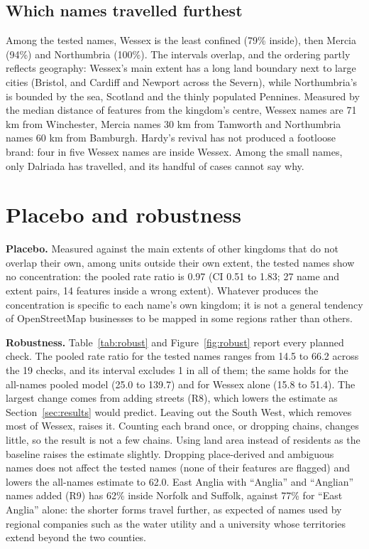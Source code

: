 \documentclass[11pt,a4paper]{article}
\begin{document}
\subsection{Which names travelled furthest}
Among the tested names, Wessex is the least confined (79\% inside), then Mercia (94\%) and Northumbria (100\%). The intervals overlap, and the ordering partly reflects geography: Wessex's main extent has a long land boundary next to large cities (Bristol, and Cardiff and Newport across the Severn), while Northumbria's is bounded by the sea, Scotland and the thinly populated Pennines. Measured by the median distance of features from the kingdom's centre, Wessex names are 71 km from Winchester, Mercia names 30 km from Tamworth and Northumbria names 60 km from Bamburgh. Hardy's revival has not produced a footloose brand: four in five Wessex names are inside Wessex. Among the small names, only Dalriada has travelled, and its handful of cases cannot say why.

\section{Placebo and robustness}\label{sec:robust}
\textbf{Placebo.} Measured against the main extents of other kingdoms that do not overlap their own, among units outside their own extent, the tested names show no concentration: the pooled rate ratio is 0.97 (CI 0.51 to 1.83; 27 name and extent pairs, 14 features inside a wrong extent). Whatever produces the concentration is specific to each name's own kingdom; it is not a general tendency of OpenStreetMap businesses to be mapped in some regions rather than others.

\textbf{Robustness.} Table~\ref{tab:robust} and Figure~\ref{fig:robust} report every planned check. The pooled rate ratio for the tested names ranges from 14.5 to 66.2 across the 19 checks, and its interval excludes 1 in all of them; the same holds for the all-names pooled model (25.0 to 139.7) and for Wessex alone (15.8 to 51.4). The largest change comes from adding streets (R8), which lowers the estimate as Section~\ref{sec:results} would predict. Leaving out the South West, which removes most of Wessex, raises it. Counting each brand once, or dropping chains, changes little, so the result is not a few chains. Using land area instead of residents as the baseline raises the estimate slightly. Dropping place-derived and ambiguous names does not affect the tested names (none of their features are flagged) and lowers the all-names estimate to 62.0. East Anglia with ``Anglia'' and ``Anglian'' names added (R9) has 62\% inside Norfolk and Suffolk, against 77\% for ``East Anglia'' alone: the shorter forms travel further, as expected of names used by regional companies such as the water utility and a university whose territories extend beyond the two counties.
\end{document}

